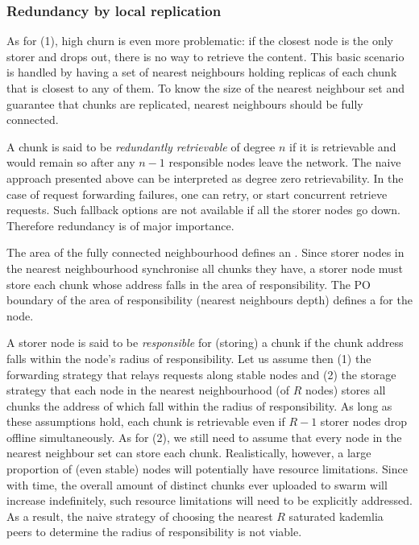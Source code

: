 \subsubsection{Redundancy by local replication}

As for (1), high churn is even more problematic: if the closest node is the only storer and drops out, there is no way to retrieve the content. This basic scenario is handled by having a set of nearest neighbours holding replicas of each chunk that is closest to any of them. To know the size of the nearest neighbour set and guarantee that chunks are replicated, nearest neighbours should be fully connected. 

A chunk is said to be \emph{redundantly retrievable} of degree $n$ if it is retrievable and would remain so after any $n-1  $ responsible nodes leave the network. The naive approach presented above can be interpreted as degree zero retrievability.
In the case of request forwarding failures, one can retry, or start concurrent retrieve requests. 
Such fallback options are not available if all the storer nodes go down. Therefore redundancy is of major importance.


The area of the fully connected neighbourhood defines an . 
Since storer nodes in the nearest neighbourhood synchronise all chunks they have, a storer node must store each chunk whose address falls in the area of responsibility. The PO boundary of the area of responsibility (nearest neighbours depth) defines a  for the node. 

A storer node is said to be \emph{responsible} for (storing) a chunk if the chunk address falls within the node's radius of responsibility.
Let us assume then (1) the forwarding strategy that relays requests along stable nodes and (2) the storage strategy that each node in the nearest neighbourhood (of $R$ nodes) stores all chunks the address of which fall within the radius of responsibility. As long as these assumptions hold, each chunk is retrievable even if $R-1$ storer nodes drop offline simultaneously. As for (2), we still need to assume that every node in the nearest neighbour set can store each chunk.
Realistically, however, a large proportion of (even stable) nodes will potentially have resource limitations.
Since with time, the overall amount of distinct chunks ever uploaded to swarm will increase indefinitely, such resource limitations will need to be explicitly addressed. 
As a result, the naive strategy of choosing the nearest $R$ saturated kademlia peers to determine the radius of responsibility is not viable.


